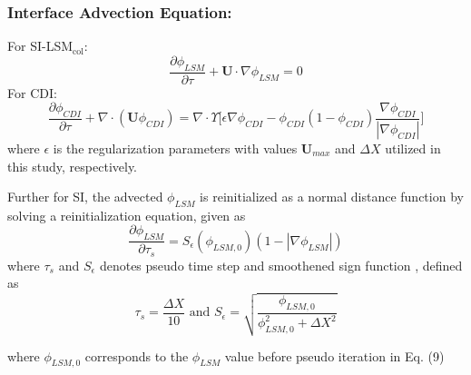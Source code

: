 \documentclass[a4paper,fleqn]{cas-sc}
\begin{document}
	\subsubsection*{Interface Advection Equation:}
	\noindent For SI-LSM$_{\text{col}}$:
	\begin{equation}\label{eqt:LSadvection}
		\frac{\partial\phi_{LSM}}{\partial\tau}+\mathbf{U}\cdot\nabla\phi_{LSM}=0
	\end{equation}
	\noindent For CDI:
	\begin{equation}\label{eqt:CDIadvectioneqt}
		\frac{\partial\phi_{CDI}}{\partial\tau}+\nabla\cdot(\mathbf{U}\phi_{CDI})=\nabla\cdot\Upsilon\bigg[\epsilon\nabla\phi_{CDI}-\phi_{CDI}(1-\phi_{CDI})\frac{\nabla\phi_{CDI}}{|\nabla\phi_{CDI}|}\bigg]
	\end{equation} 
	where $\epsilon$ is the regularization parameters with values $\mathbf{U}_{max}$ and $\Delta X$ utilized in this study, respectively. 
	
	Further for SI, the advected $\phi_{LSM}$ is reinitialized as a normal distance function by solving a reinitialization equation, given as
	\begin{equation}\label{eqt:reinitialization}
		\frac{\partial\phi_{LSM}}{\partial\tau_s}=S_{\epsilon}(\phi_{LSM,0})(1-|\nabla\phi_{LSM}|)
	\end{equation}
	where $\tau_s$ and $S_{\epsilon}$ denotes pseudo time step and smoothened sign function \cite{Sussman1994}, defined as
	\begin{equation*}
		\tau_s=\frac{\Delta X}{10} \text{ and } S_{\epsilon}=\sqrt{\frac{\phi_{LSM,0}}{\phi_{LSM,0}^2+\Delta X^2}}
	\end{equation*} 
	
	\noindent where $\phi_{LSM,0}$ corresponds to the $\phi_{LSM}$ value before pseudo iteration in Eq. (9)
	
\end{document}
